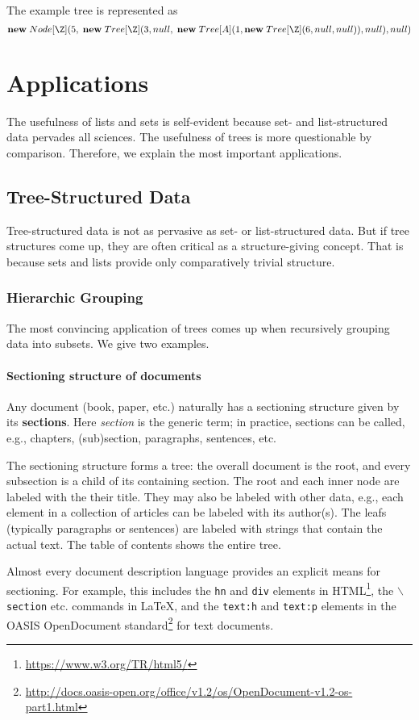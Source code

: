 The example tree is represented as
\[\anew{Node[\Z]}{5,\; \anew{Tree[\Z]}{3,null, \;\anew{Tree[A]}{1, \anew{Tree[\Z]}{6,null,null}}, null}, null}\]

\section{Applications}

The usefulness of lists and sets is self-evident because set- and list-structured data pervades all sciences.
The usefulness of trees is more questionable by comparison.
Therefore, we explain the most important applications.

\subsection{Tree-Structured Data}

Tree-structured data is not as pervasive as set- or list-structured data.
But if tree structures come up, they are often critical as a structure-giving concept.
That is because sets and lists provide only comparatively trivial structure.

\subsubsection{Hierarchic Grouping}

The most convincing application of trees comes up when recursively grouping data into subsets.
We give two examples.

\paragraph{Sectioning structure of documents}
Any document (book, paper, etc.) naturally has a sectioning structure given by its \textbf{sections}.
Here \emph{section} is the generic term; in practice, sections can be called, e.g., chapters, (sub)section, paragraphs, sentences, etc.

The sectioning structure forms a tree: the overall document is the root, and every subsection is a child of its containing section.
The root and each inner node are labeled with the their title.
They may also be labeled with other data, e.g., each element in a collection of articles can be labeled with its author(s).
The leafs (typically paragraphs or sentences) are labeled with strings that contain the actual text.
The table of contents shows the entire tree.

Almost every document description language provides an explicit means for sectioning.
For example, this includes the \texttt{hn} and \texttt{div} elements in HTML\footnote{\url{https://www.w3.org/TR/html5/}}, the \texttt{$\backslash$section} etc. commands in LaTeX, and the \texttt{text:h} and \texttt{text:p} elements in the OASIS OpenDocument standard\footnote{\url{http://docs.oasis-open.org/office/v1.2/os/OpenDocument-v1.2-os-part1.html}} for text documents.


